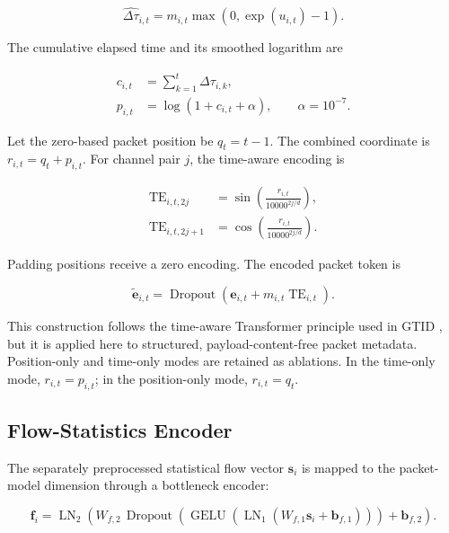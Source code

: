 \documentclass[11pt,fleqn]{report}
\begin{document}
\begin{equation}
    \widehat{\Delta\tau}_{i,t}
    =m_{i,t}\max\left(0,\exp(u_{i,t})-1\right).
    \label{eq:reconstructed_iat}
\end{equation}

The cumulative elapsed time and its smoothed logarithm are

\begin{align}
    c_{i,t} &= \sum_{k=1}^{t}\widehat{\Delta\tau}_{i,k},\\
    p_{i,t} &= \log\left(1+c_{i,t}+\alpha\right),
    \qquad \alpha=10^{-7}.
    \label{eq:cumulative_time_feature}
\end{align}

Let the zero-based packet position be $q_t=t-1$. The combined coordinate is
$r_{i,t}=q_t+p_{i,t}$. For channel pair $j$, the time-aware encoding is

\begin{align}
    \operatorname{TE}_{i,t,2j}
    &=\sin\left(
        \frac{r_{i,t}}{10000^{2j/d}}
      \right),\\
    \operatorname{TE}_{i,t,2j+1}
    &=\cos\left(
        \frac{r_{i,t}}{10000^{2j/d}}
      \right).
    \label{eq:time_aware_sinusoid}
\end{align}

Padding positions receive a zero encoding. The encoded packet token is

\begin{equation}
    \widetilde{\mathbf{e}}_{i,t}
    =\operatorname{Dropout}
    \left(
        \mathbf{e}_{i,t}+m_{i,t}\operatorname{TE}_{i,t}
    \right).
    \label{eq:time_encoded_packet}
\end{equation}

This construction follows the time-aware Transformer principle used in GTID
\cite{Han2023GTID}, but it is applied here to structured, payload-content-free
packet metadata. Position-only and time-only modes are retained as ablations.
In the time-only mode, $r_{i,t}=p_{i,t}$; in the position-only mode,
$r_{i,t}=q_t$.

\subsection{Flow-Statistics Encoder}
\label{subsubsec:flow_encoder}

The separately preprocessed statistical flow vector $\mathbf{s}_i$ is mapped
to the packet-model dimension through a bottleneck encoder:

\begin{equation}
    \mathbf{f}_i
    =\operatorname{LN}_2
    \left(
        W_{f,2}\,
        \operatorname{Dropout}
        \left(
            \operatorname{GELU}
            \left(
                \operatorname{LN}_1(W_{f,1}\mathbf{s}_i+\mathbf{b}_{f,1})
            \right)
        \right)
        +\mathbf{b}_{f,2}
    \right).
    \label{eq:flow_feature_encoder}
\end{equation}
\end{document}
